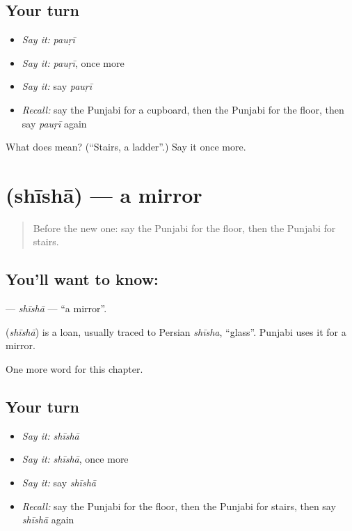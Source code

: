 \subsection*{Your turn}
\begin{itemize}
\raggedright
  \item \emph{Say it:} \emph{pauṛī}
  \item \emph{Say it:} \emph{pauṛī}, once more
  \item \emph{Say it:} say \emph{pauṛī}
  \item \emph{Recall:} say the Punjabi for a cupboard, then the Punjabi for the floor, then say \emph{pauṛī} again
\end{itemize}

\begin{tcolorbox}[breakable,colback=teal!4,colframe=teal!35!black,title={Before you move on}]
What does  mean? (\textquotedblleft{}Stairs, a ladder\textquotedblright{}.) Say it once more.
\end{tcolorbox}
\section[\texorpdfstring{\pa{ਸ਼ੀਸ਼ਾ} (shīshā)}{ਸ਼ੀਸ਼ਾ (shīshā)}]{ (shīshā) — a mirror}

\label{lesson:PA-C69-shisha}



\begin{quote}
Before the new one: say the Punjabi for the floor, then the Punjabi for stairs.
\end{quote}

\subsection*{You'll want to know: }
\textbf{} — \emph{shīshā} — \textquotedblleft{}a mirror\textquotedblright{}.

\begin{cousinweb}
\textbf{} (\emph{shīshā}) is a loan, usually traced to Persian \emph{shīsha}, \textquotedblleft{}glass\textquotedblright{}. Punjabi uses it for a mirror.
\end{cousinweb}

\begin{grammarlens}[title={What you've built}]
One more word for this chapter.
\end{grammarlens}

\subsection*{Your turn}
\begin{itemize}
\raggedright
  \item \emph{Say it:} \emph{shīshā}
  \item \emph{Say it:} \emph{shīshā}, once more
  \item \emph{Say it:} say \emph{shīshā}
  \item \emph{Recall:} say the Punjabi for the floor, then the Punjabi for stairs, then say \emph{shīshā} again
\end{itemize}

